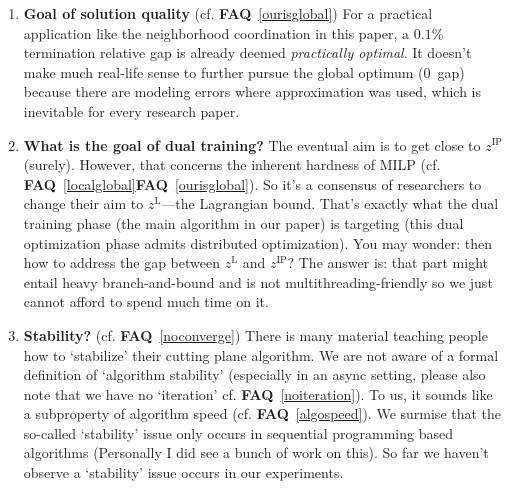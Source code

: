 \documentclass[11pt]{article}
\newcommand{\faq}[1]{\textbf{FAQ}~\ref{#1}}
\begin{document}
\begin{enumerate}
    (see \faq{localglobal} first)
    Gurobi, as a MILP solver, provides a primal bound (\texttt{ObjVal}) as
    well as a dual bound (\texttt{ObjBound}).
    You can think of our methodology as a higher-level solver that is based on Gurobi,
    which means that we can also provide valid primal and dual bounds.
    Since Gurobi cannot guarantee solving an MILP to zero gap in a finite time,
    neither can our method. 
    But the real meaningful thing is just \textit{not to} attain global optimality,
    but is instead to see if small gaps can be reached within a certain training period. (cf. \faq{practicallyoptimal})
    \item \textbf{Goal of solution quality} \label{practicallyoptimal} (cf. \faq{ourisglobal})
    For a practical application like the neighborhood coordination in this paper,
    a $0.1\%$ termination relative gap is already deemed \textit{practically optimal}.
    It doesn't make much real-life sense to further pursue the global optimum (0~gap) because there are
    modeling errors where approximation was used, which is inevitable for every research paper.
    \item \textbf{What is the goal of dual training?} \label{goaldualtrain}
    The eventual aim is to get close to $z^\mathrm{IP}$ (surely). However, that concerns the
    inherent hardness of MILP (cf. \faq{localglobal}\faq{ourisglobal}).
    So it's a consensus of researchers to change their aim to $z^\mathrm{L}$---the Lagrangian bound.
    That's exactly what the dual training phase (the main algorithm in our paper) is targeting
    (this dual optimization phase admits distributed optimization).
    You may wonder: then how to address the gap between $z^\mathrm{L}$ and $z^\mathrm{IP}$?
    The answer is: that part might entail heavy branch-and-bound and is not multithreading-friendly
    so we just cannot afford to spend much time on it.
    \item \textbf{Stability?} \label{algostability} (cf. \faq{noconverge})
    There is many material teaching people how to `stabilize' their cutting plane algorithm.
    We are not aware of a formal definition of `algorithm stability' (especially
    in an async setting, please also note that we have no `iteration' cf. \faq{noiteration}).
    To us, it sounds like a subproperty of algorithm speed (cf. \faq{algospeed}).
    We surmise that the so-called `stability' issue only occurs in sequential programming
    based algorithms (Personally I did see a bunch of work on this).
    So far we haven't observe a `stability' issue occurs in our experiments.

\end{enumerate}
\end{document}
